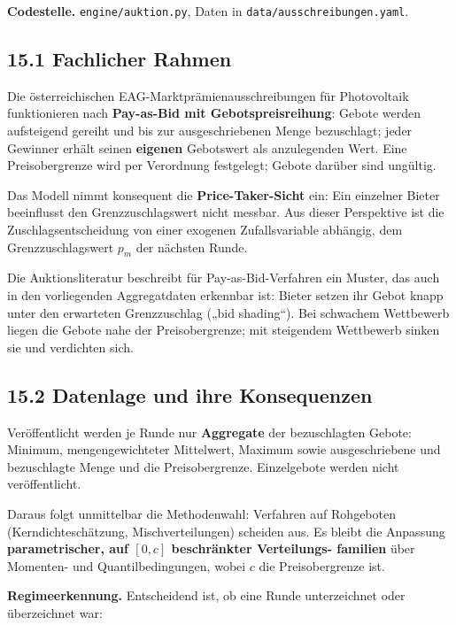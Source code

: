 \documentclass[
  a4paper,
  10pt]{article}
\begin{document}
\textbf{Codestelle.} \nolinkurl{engine/auktion.py}, Daten in
\nolinkurl{data/ausschreibungen.yaml}.

\hypertarget{fachlicher-rahmen}{%
\subsection{15.1 Fachlicher Rahmen}\label{fachlicher-rahmen}}

Die österreichischen EAG-Marktprämienausschreibungen für Photovoltaik
funktionieren nach \textbf{Pay-as-Bid mit Gebotspreisreihung}: Gebote
werden aufsteigend gereiht und bis zur ausgeschriebenen Menge
bezuschlagt; jeder Gewinner erhält seinen \textbf{eigenen} Gebotswert
als anzulegenden Wert. Eine Preisobergrenze wird per Verordnung
festgelegt; Gebote darüber sind ungültig.

Das Modell nimmt konsequent die \textbf{Price-Taker-Sicht} ein: Ein
einzelner Bieter beeinflusst den Grenzzuschlagswert nicht messbar. Aus
dieser Perspektive ist die Zuschlagsentscheidung von einer exogenen
Zufallsvariable abhängig, dem Grenzzuschlagswert \(p_m\) der nächsten
Runde.

Die Auktionsliteratur beschreibt für Pay-as-Bid-Verfahren ein Muster,
das auch in den vorliegenden Aggregatdaten erkennbar ist: Bieter setzen
ihr Gebot knapp unter den erwarteten Grenzzuschlag („bid shading``). Bei
schwachem Wettbewerb liegen die Gebote nahe der Preisobergrenze; mit
steigendem Wettbewerb sinken sie und verdichten sich.

\hypertarget{datenlage-und-ihre-konsequenzen}{%
\subsection{15.2 Datenlage und ihre
Konsequenzen}\label{datenlage-und-ihre-konsequenzen}}

Veröffentlicht werden je Runde nur \textbf{Aggregate} der bezuschlagten
Gebote: Minimum, mengengewichteter Mittelwert, Maximum sowie
ausgeschriebene und bezuschlagte Menge und die Preisobergrenze.
Einzelgebote werden nicht veröffentlicht.

Daraus folgt unmittelbar die Methodenwahl: Verfahren auf Rohgeboten
(Kerndichteschätzung, Mischverteilungen) scheiden aus. Es bleibt die
Anpassung \textbf{parametrischer, auf \([0, c]\) beschränkter
Verteilungs- familien} über Momenten- und Quantilbedingungen, wobei
\(c\) die Preisobergrenze ist.

\textbf{Regimeerkennung.} Entscheidend ist, ob eine Runde unterzeichnet
oder überzeichnet war:
\end{document}
